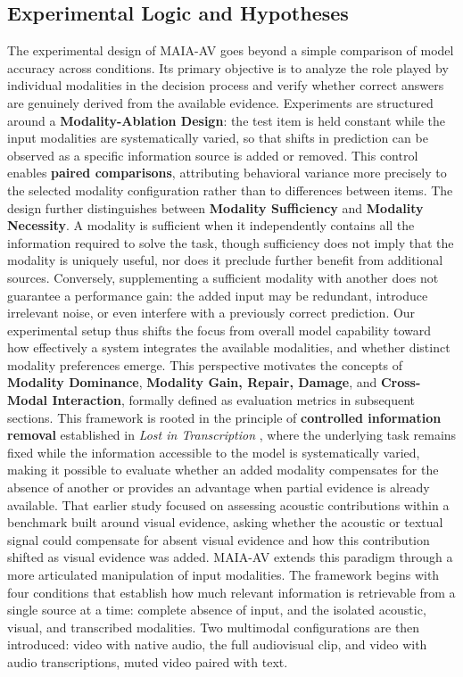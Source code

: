 \subsection*{Experimental Logic and Hypotheses}
The experimental design of MAIA-AV goes beyond a simple comparison of model accuracy across conditions. Its primary objective is to analyze the role played by individual modalities in the decision process and verify whether correct answers are genuinely derived from the available evidence.
Experiments are structured around a \textbf{Modality-Ablation Design}: the test item is held constant while the input modalities are systematically varied, so that shifts in prediction can be observed as a specific information source is added or removed. This control enables \textbf{paired comparisons}, attributing behavioral variance more precisely to the selected modality configuration rather than to differences between items.
The design further distinguishes between \textbf{Modality Sufficiency} and \textbf{Modality Necessity}. A modality is sufficient when it independently contains all the information required to solve the task, though sufficiency does not imply that the modality is uniquely useful, nor does it preclude further benefit from additional sources. Conversely, supplementing a sufficient modality with another does not guarantee a performance gain: the added input may be redundant, introduce irrelevant noise, or even interfere with a previously correct prediction.
Our experimental setup thus shifts the focus from overall model capability toward how effectively a system integrates the available modalities, and whether distinct modality preferences emerge. This perspective motivates the concepts of \textbf{Modality Dominance}, \textbf{Modality Gain, Repair, Damage}, and \textbf{Cross-Modal Interaction}, formally defined as evaluation metrics in subsequent sections.
This framework is rooted in the principle of \textbf{controlled information removal} established in \textit{Lost in Transcription} \cite{deodati2026lost}, where the underlying task remains fixed while the information accessible to the model is systematically varied, making it possible to evaluate whether an added modality compensates for the absence of another or provides an advantage when partial evidence is already available. That earlier study focused on assessing acoustic contributions within a benchmark built around visual evidence, asking whether the acoustic or textual signal could compensate for absent visual evidence and how this contribution shifted as visual evidence was added.
MAIA-AV extends this paradigm through a more articulated manipulation of input modalities. The framework begins with four conditions that establish how much relevant information is retrievable from a single source at a time: complete absence of input, and the isolated acoustic, visual, and transcribed modalities. Two multimodal configurations are then introduced: video with native audio, the full audiovisual clip, and video with audio transcriptions, muted video paired with text.
